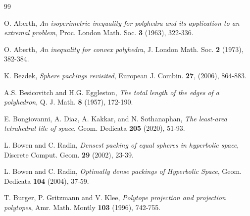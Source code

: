 \documentclass[twoside]{amsart}
\theoremstyle{definition}
\begin{document}
\begin{thebibliography}{99}

 O. Aberth, \emph{An isoperimetric inequality for polyhedra and its application to an extremal problem}, Proc. London Math. Soc. \textbf{3} (1963), 322-336.

 O. Aberth, \emph{An inequality for convex polyhedra}, J. London Math. Soc. \textbf{2} (1973), 382-384.

 K. Bezdek, \emph{Sphere packings revisited}, European J. Combin. \textbf{27}, (2006), 864-883.

 A.S. Besicovitch and H.G. Eggleston, \emph{The total length of the edges of a polyhedron}, Q. J. Math. \textbf{8} (1957), 172-190.

 E. Bongiovanni, A. Diaz, A. Kakkar, and N. Sothanaphan, \emph{The least-area tetrahedral tile of space}, Geom. Dedicata \textbf{205} (2020), 51-93.

 L. Bowen and C. Radin, \emph{Densest packing of equal spheres in hyperbolic space}, Discrete Comput. Geom. \textbf{29} (2002), 23-39.

 L. Bowen and C. Radin, \emph{Optimally dense packings of Hyperbolic Space}, Geom. Dedicata \textbf{104} (2004), 37-59.

 T. Burger, P. Gritzmann and V. Klee, \emph{Polytope projection and projection polytopes}, Amr. Math. Montly \textbf{103} (1996), 742-755.








\end{thebibliography}
\end{document}
